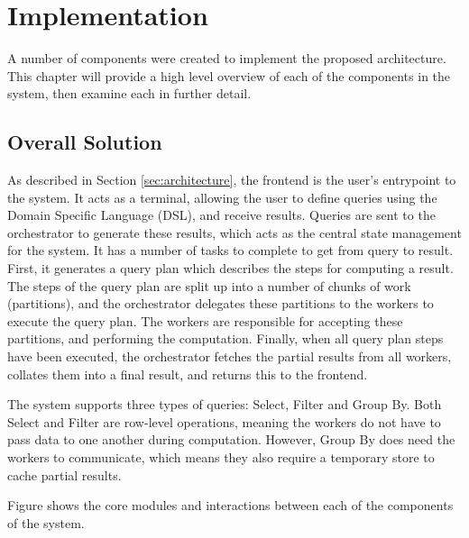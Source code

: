 \chapter{Implementation}

A number of components were created to implement the proposed architecture. This chapter will provide a high level overview of each of the components in the system, then examine each in further detail.

\section{Overall Solution}
As described in Section \ref{sec:architecture}, the frontend is the user's entrypoint to the system. It acts as a terminal, allowing the user to define queries using the Domain Specific Language (DSL), and receive results. Queries are sent to the orchestrator to generate these results, which acts as the central state management for the system. It has a number of tasks to complete to get from query to result. First, it generates a query plan which describes the steps for computing a result. The steps of the query plan are split up into a number of chunks of work (partitions), and the orchestrator delegates these partitions to the workers to execute the query plan. The workers are responsible for accepting these partitions, and performing the computation. Finally, when all query plan steps have been executed, the orchestrator fetches the partial results from all workers, collates them into a final result, and returns this to the frontend. 

The system supports three types of queries: Select, Filter and Group By. Both Select and Filter are row-level operations, meaning the workers do not have to pass data to one another during computation. However, Group By does need the workers to communicate, which means they also require a temporary store to cache partial results.

Figure  shows the core modules and interactions between each of the components of the system.



